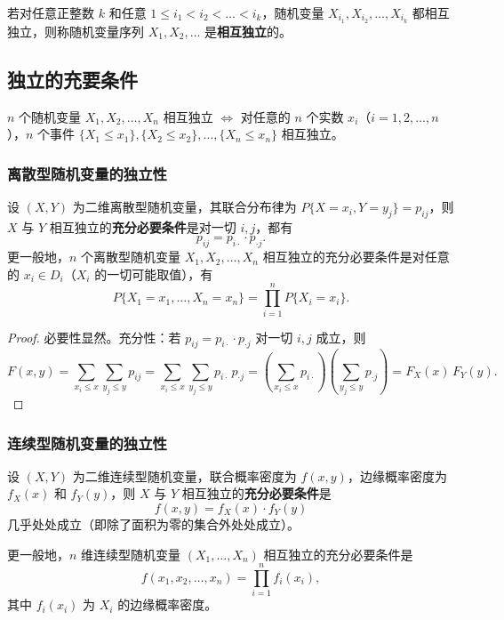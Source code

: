 \documentclass[lang=cn,11pt]{elegantbook}
\begin{document}
\begin{definition}[随机变量序列的独立性]\label{def:sequence-independence} 
若对任意正整数 $k$ 和任意 $1 \leqslant i_1 < i_2 < \dots < i_k$，随机变量 $X_{i_1}, X_{i_2}, \dots, X_{i_k}$ 都相互独立，则称随机变量序列 $X_1, X_2, \dots$ 是\textbf{相互独立}的。
\end{definition}

\subsection{独立的充要条件}

$n$ 个随机变量 $X_1, X_2, \dots, X_n$ 相互独立
$\iff$ 对任意的 $n$ 个实数 $x_i$（$i=1,2,\dots,n$），$n$ 个事件 $\{X_1 \leqslant x_1\}, \{X_2 \leqslant x_2\}, \dots, \{X_n \leqslant x_n\}$ 相互独立。

\subsubsection{离散型随机变量的独立性}

\begin{theorem}[离散型随机变量独立的判定]\label{thm:discrete-independence}
设 $(X,Y)$ 为二维离散型随机变量，其联合分布律为 $P\{X = x_i, Y = y_j\} = p_{ij}$，则 $X$ 与 $Y$ 相互独立的\textbf{充分必要条件}是对一切 $i, j$，都有
\[
p_{ij} = p_{i\cdot} \cdot p_{\cdot j}.
\]
更一般地，$n$ 个离散型随机变量 $X_1, X_2, \dots, X_n$ 相互独立的充分必要条件是对任意的 $x_i \in D_i$（$X_i$ 的一切可能取值），有
\[
P\{X_1 = x_1, \dots, X_n = x_n\} = \prod_{i=1}^{n}P\{X_i = x_i\}.
\]
\end{theorem}

\begin{proof}
必要性显然。充分性：若 $p_{ij} = p_{i\cdot} \cdot p_{\cdot j}$ 对一切 $i,j$ 成立，则
\[
F(x,y) = \sum_{x_i \leqslant x}\sum_{y_j \leqslant y}p_{ij} = \sum_{x_i \leqslant x}\sum_{y_j \leqslant y}p_{i\cdot}\,p_{\cdot j} = \left(\sum_{x_i \leqslant x}p_{i\cdot}\right)\left(\sum_{y_j \leqslant y}p_{\cdot j}\right) = F_X(x)\,F_Y(y).
\]
\end{proof}

\subsubsection{连续型随机变量的独立性}

\begin{theorem}[连续型随机变量独立的判定]\label{thm:continuous-independence}
设 $(X,Y)$ 为二维连续型随机变量，联合概率密度为 $f(x,y)$，边缘概率密度为 $f_X(x)$ 和 $f_Y(y)$，则 $X$ 与 $Y$ 相互独立的\textbf{充分必要条件}是
\[
f(x,y) = f_X(x) \cdot f_Y(y)
\]
几乎处处成立（即除了面积为零的集合外处处成立）。

更一般地，$n$ 维连续型随机变量 $(X_1, \dots, X_n)$ 相互独立的充分必要条件是
\[
f(x_1, x_2, \dots, x_n) = \prod_{i=1}^{n}f_i(x_i),
\]
其中 $f_i(x_i)$ 为 $X_i$ 的边缘概率密度。
\end{theorem}
\end{document}
